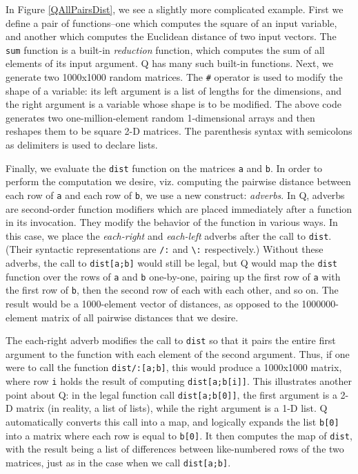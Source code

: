\documentclass[preprint]{sigplanconf}
\begin{document}
In Figure \ref{QAllPairsDist}, we see a slightly more complicated example.  First we define a pair of functions--one which computes the square of an input variable, and another which computes the Euclidean distance of two input vectors.  The \texttt{sum} function is a built-in {\it reduction} function, which computes the sum of all elements of its input argument.  Q has many such built-in functions.  Next, we generate two 1000x1000 random matrices.  The \texttt{\#} operator is used to modify the shape of a variable: its left argument is a list of lengths for the dimensions, and the right argument is a variable whose shape is to be modified.  The above code generates two one-million-element random 1-dimensional arrays and then reshapes them to be square 2-D matrices.  The parenthesis syntax with semicolons as delimiters is used to declare lists.

Finally, we evaluate the \texttt{dist} function on the matrices \texttt{a} and \texttt{b}.  In order to perform the computation we desire, viz. computing the pairwise distance between each row of \texttt{a} and each row of \texttt{b}, we use a new construct: {\it adverbs}.  In Q, adverbs are second-order function modifiers which are placed immediately after a function in its invocation.  They modify the behavior of the function in various ways.  In this case, we place the {\it each-right} and {\it each-left} adverbs after the call to \texttt{dist}.  (Their syntactic representations are \texttt{/:} and \texttt{\textbackslash:} respectively.)  Without these adverbs, the call to \texttt{dist[a;b]} would still be legal, but Q would map the \texttt{dist} function over the rows of \texttt{a} and \texttt{b} one-by-one, pairing up the first row of \texttt{a} with the first row of \texttt{b}, then the second row of each with each other, and so on.  The result would be a 1000-element vector of distances, as opposed to the 1000000-element matrix of all pairwise distances that we desire.

The each-right adverb modifies the call to \texttt{dist} so that it pairs the entire first argument to the function with each element of the second argument.  Thus, if one were to call the function \texttt{dist/:[a;b]}, this would produce a 1000x1000 matrix, where row \texttt{i} holds the result of computing \texttt{dist[a;b[i]]}.  This illustrates another point about Q: in the legal function call \texttt{dist[a;b[0]]}, the first argument is a 2-D matrix (in reality, a list of lists), while the right argument is a 1-D list.  Q automatically converts this call into a map, and logically expands the list \texttt{b[0]} into a matrix where each row is equal to \texttt{b[0]}.  It then computes the map of \texttt{dist}, with the result being a list of differences between like-numbered rows of the two matrices, just as in the case when we call \texttt{dist[a;b]}.
\end{document}
